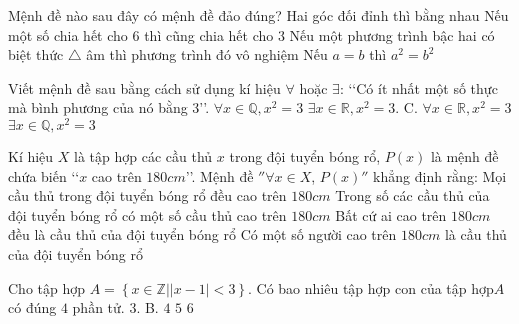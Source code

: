 \begin{ex}
	Mệnh đề nào sau đây có mệnh đề đảo đúng?
	\choice
	{Hai góc đối đỉnh thì bằng nhau}
	{Nếu một số chia hết cho 6 thì cũng chia hết cho 3}
	{\True Nếu một phương trình bậc hai có biệt thức $\triangle $ âm thì phương trình đó vô nghiệm}
	{Nếu $a=b$ thì $a^2=b^2$}
\end{ex}
\begin{ex}
	Viết mệnh đề sau bằng cách sử dụng kí hiệu $\forall $ hoặc $\exists $: \lq\lq Có ít nhất một số thực mà bình phương của nó bằng 3\rq\rq.
	\choice
	{$\forall x\in \mathbb{Q},x^2=3$}
	{\True $\exists x\in \mathbb{R},x^2=3$. C. $\forall x\in \mathbb{R},x^2=3$}
	{$\exists x\in \mathbb{Q},x^2=3$}
\end{ex}
\begin{ex}
	Kí hiệu $X$ là tập hợp các cầu thủ $x$ trong đội tuyển bóng rổ, $P(x)$ là mệnh đề chứa biến \lq\lq $x$ cao trên $180 cm$\rq\rq. Mệnh đề $''\forall x\in X$, $P(x)''$ khẳng định rằng:
	\choice
	{\True Mọi cầu thủ trong đội tuyển bóng rổ đều cao trên $180 cm$}
	{Trong số các cầu thủ của đội tuyển bóng rổ có một số cầu thủ cao trên $180 cm$}
	{Bất cứ ai cao trên $180 cm$ đều là cầu thủ của đội tuyển bóng rổ}
	{Có một số người cao trên $180 cm$ là cầu thủ của đội tuyển bóng rổ}
\end{ex}
\begin{ex}
	Cho tập hợp $A=\left\{ x\in \mathbb{Z}\left| |x-1|<3 \right. \right\}$. Có bao nhiêu tập hợp con của tập hợp$A$ có đúng $4$ phần tử.
	\choice
	{$3$. B. $4$}
	{\True $5$}
	{$6$}
\end{ex}
